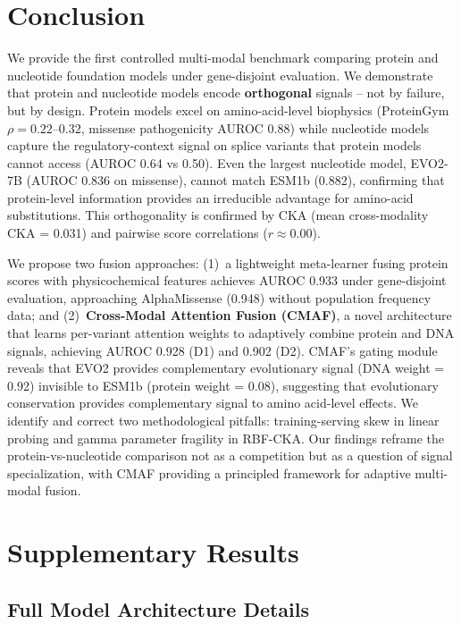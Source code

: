 \documentclass[9pt]{article}
\begin{document}
\section{Conclusion}

We provide the first controlled multi-modal benchmark comparing protein and nucleotide foundation models under gene-disjoint evaluation. We demonstrate that protein and nucleotide models encode \textbf{orthogonal} signals -- not by failure, but by design. Protein models excel on amino-acid-level biophysics (ProteinGym $\rho = 0.22$--$0.32$, missense pathogenicity AUROC 0.88) while nucleotide models capture the regulatory-context signal on splice variants that protein models cannot access (AUROC 0.64 vs 0.50). Even the largest nucleotide model, EVO2-7B (AUROC 0.836 on missense), cannot match ESM1b (0.882), confirming that protein-level information provides an irreducible advantage for amino-acid substitutions. This orthogonality is confirmed by CKA (mean cross-modality CKA = 0.031) and pairwise score correlations ($r \approx 0.00$).

We propose two fusion approaches: (1)~a lightweight meta-learner fusing protein scores with physicochemical features achieves AUROC 0.933 under gene-disjoint evaluation, approaching AlphaMissense (0.948) without population frequency data; and (2)~\textbf{Cross-Modal Attention Fusion (CMAF)}, a novel architecture that learns per-variant attention weights to adaptively combine protein and DNA signals, achieving AUROC 0.928 (D1) and 0.902 (D2). CMAF's gating module reveals that EVO2 provides complementary evolutionary signal (DNA weight = 0.92) invisible to ESM1b (protein weight = 0.08), suggesting that evolutionary conservation provides complementary signal to amino acid-level effects. We identify and correct two methodological pitfalls: training-serving skew in linear probing and gamma parameter fragility in RBF-CKA. Our findings reframe the protein-vs-nucleotide comparison not as a competition but as a question of signal specialization, with CMAF providing a principled framework for adaptive multi-modal fusion.

\appendix

\section{Supplementary Results}

\subsection{Full Model Architecture Details}
\end{document}
